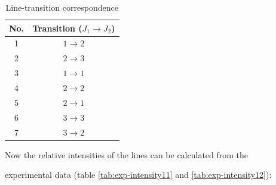 \documentclass[a4paper]{article}
\begin{document}
\begin{table}

\centering

\begin{tabular}{c|c}

No. & Transition ($J_1 \to J_2$)\\

\hline

1 & $1 \to 2$ \\

2 & $2 \to 3$ \\

3 & $1 \to 1$ \\

4 & $2 \to 2$\\

5 & $2 \to 1$\\

6 & $3 \to 3$\\

7 & $3 \to 2$\\

\hline

\end{tabular}

\caption{Line-transition correspondence}

\label{tab:line-transition1}

\end{table}

Now the relative intensities of the lines can be calculated from the

experimental data (table \ref{tab:exp-intensity11} and \ref{tab:exp-intensity12}):
\end{document}
